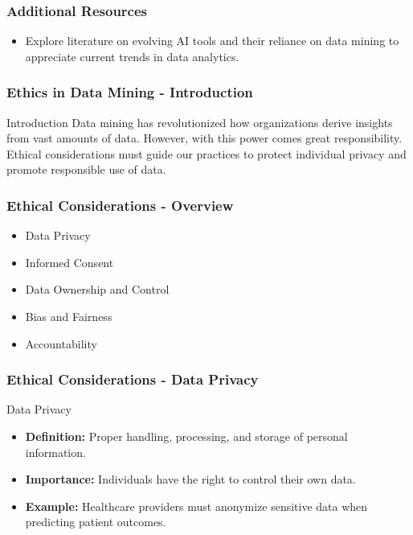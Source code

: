 \documentclass[aspectratio=169]{beamer}
\begin{document}
\begin{frame}[fragile]
    \frametitle{Additional Resources}
    \begin{itemize}
        \item Explore literature on evolving AI tools and their reliance on data mining to appreciate current trends in data analytics.
    \end{itemize}
\end{frame}

\begin{frame}[fragile]
    \frametitle{Ethics in Data Mining - Introduction}
    \begin{block}{Introduction}
        Data mining has revolutionized how organizations derive insights from vast amounts of data. However, with this power comes great responsibility. Ethical considerations must guide our practices to protect individual privacy and promote responsible use of data.
    \end{block}
\end{frame}

\begin{frame}[fragile]
    \frametitle{Ethical Considerations - Overview}
    \begin{itemize}
        \item Data Privacy
        \item Informed Consent
        \item Data Ownership and Control
        \item Bias and Fairness
        \item Accountability
    \end{itemize}
\end{frame}

\begin{frame}[fragile]
    \frametitle{Ethical Considerations - Data Privacy}
    \begin{block}{Data Privacy}
        \begin{itemize}
            \item \textbf{Definition:} Proper handling, processing, and storage of personal information.
            \item \textbf{Importance:} Individuals have the right to control their own data.
            \item \textbf{Example:} Healthcare providers must anonymize sensitive data when predicting patient outcomes.
        \end{itemize}
    \end{block}
\end{frame}
\end{document}
